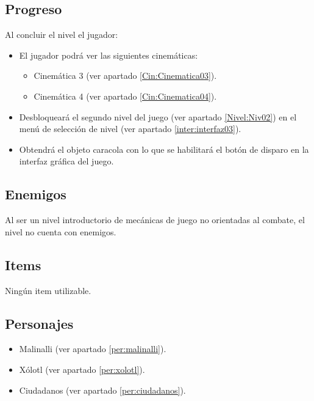 	\subsection{Progreso}
	Al concluir el nivel el jugador:
\begin{itemize}
	\item El jugador podrá ver las siguientes cinemáticas:
	\begin{itemize}
		\item Cinemática 3 (ver apartado \ref{Cin:Cinematica03}).
		\item Cinemática 4 (ver apartado \ref{Cin:Cinematica04}).
	\end{itemize}
\item Desbloqueará el segundo nivel del juego (ver apartado \ref{Nivel:Niv02}) en el menú de selección de nivel (ver apartado \ref{inter:interfaz03}).
\item Obtendrá el objeto caracola con lo que se habilitará el botón de disparo en la interfaz gráfica del juego.
\end{itemize}
	\subsection{Enemigos}
Al ser un nivel introductorio de mecánicas de juego no orientadas al combate, el nivel no cuenta con enemigos.
	\subsection{Items}
Ningún item utilizable.
	\subsection{Personajes}
		\begin{itemize}
			\item Malinalli (ver apartado			\ref{per:malinalli}).	
			\item Xólotl (ver apartado \ref{per:xolotl}).	
		
			\item Ciudadanos (ver apartado \ref{per:ciudadanos}).
			 
		\end{itemize}
